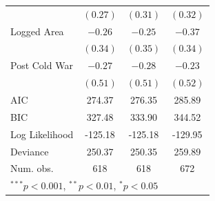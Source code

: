 \documentclass[12pt,]{book}
\let\origtable\table
\let\endorigtable\endtable
\renewenvironment{table}[1][2] {
    \singlespacing
    \expandafter\origtable\expandafter[H]
} {
    \endorigtable
}
\theoremstyle{definition}
\theoremstyle{definition}
\theoremstyle{definition}
\theoremstyle{remark}
\begin{document}
\begin{table}
\begin{center}
\begin{tabular}{l c c c }
                                        & $(0.27)$     & $(0.31)$     & $(0.32)$     \\
Logged Area                             & $-0.26$      & $-0.25$      & $-0.37$      \\
                                        & $(0.34)$     & $(0.35)$     & $(0.34)$     \\
Post Cold War                           & $-0.27$      & $-0.28$      & $-0.23$      \\
                                        & $(0.51)$     & $(0.51)$     & $(0.52)$     \\
\hline
AIC                                     & 274.37       & 276.35       & 285.89       \\
BIC                                     & 327.48       & 333.90       & 344.52       \\
Log Likelihood                          & -125.18      & -125.18      & -129.95      \\
Deviance                                & 250.37       & 250.35       & 259.89       \\
Num. obs.                               & 618          & 618          & 672          \\
\hline
\multicolumn{4}{l}{\scriptsize{$^{***}p<0.001$, $^{**}p<0.01$, $^*p<0.05$}}
\end{tabular}
\caption{Logit Models of Multi-Rebel Conflict-Years (Secessionist Conflicts Only)}
\label{tab:combined-sec}
\end{center}
\end{table}
\end{document}
